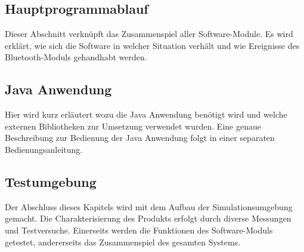\subsection{Hauptprogrammablauf}
Dieser Abschnitt verknüpft das Zusammenspiel aller Software-Module.
Es wird erklärt, wie sich die Software in welcher Situation verhält und wie Ereignisse des Bluetooth-Moduls gehandhabt werden.

\subsection{Java Anwendung}
Hier wird kurz erläutert wozu die Java Anwendung benötigt wird und welche externen Bibliotheken zur Umsetzung verwendet wurden. Eine genaue Beschreibung zur Bedienung der Java Anwendung folgt in einer separaten Bedienungsanleitung.

\subsection{Testumgebung}
Der Abschluss dieses Kapitels wird mit dem Aufbau der Simulationsumgebung gemacht. Die Charakterisierung des Produkts erfolgt durch diverse Messungen und Testversuche. Einerseits werden die Funktionen des Software-Moduls getestet, andererseits das Zusammenspiel des gesamten Systems.